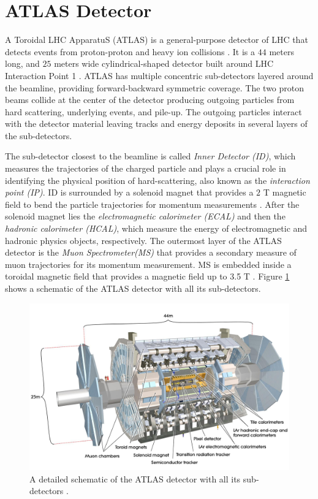 \section{ATLAS Detector}
\label{sec:ATLAS}

A Toroidal LHC ApparatuS (ATLAS) is a general-purpose detector of LHC that detects events from proton-proton and heavy ion collisions \cite{ATLAS}. It is a $44$ meters long, and $25$ meters wide cylindrical-shaped detector built around LHC Interaction Point 1 \cite{ATLAS}. ATLAS has multiple concentric sub-detectors layered around the beamline, providing forward-backward symmetric coverage. The two proton beams collide at the center of the detector producing outgoing particles from hard scattering, underlying events, and pile-up. The outgoing particles interact with the detector material leaving tracks and energy deposits in several layers of the sub-detectors. 

The sub-detector closest to the beamline is called \textit{Inner Detector (ID)}, which measures the trajectories of the charged particle and plays a crucial role in identifying the physical position of hard-scattering, also known as the \textit{interaction point (IP)}. ID is surrounded by a solenoid magnet that provides a $2$ T magnetic field to bend the particle trajectories for momentum measurements \cite{ATLAS}. After the solenoid magnet lies the \textit{electromagnetic calorimeter (ECAL)} and then the \textit{hadronic calorimeter (HCAL)}, which measure the energy of electromagnetic and hadronic physics objects, respectively. The outermost layer of the ATLAS detector is the \textit{Muon Spectrometer(MS)} that provides a secondary measure of muon trajectories for its momentum measurement. MS is embedded inside a toroidal magnetic field that provides a magnetic field up to 3.5 T \cite{ATLAS}. Figure \ref{fig:ATLAS} shows a schematic of the ATLAS detector with all its sub-detectors.

\begin{figure}
    \centering
    \includegraphics[width=.98\linewidth]{figures/LHC/AtlasDetector.png}
    \caption{ A detailed schematic of the ATLAS detector with all its sub-detectors \cite{ATLAS}.\label{fig:ATLAS}}
\end{figure}


